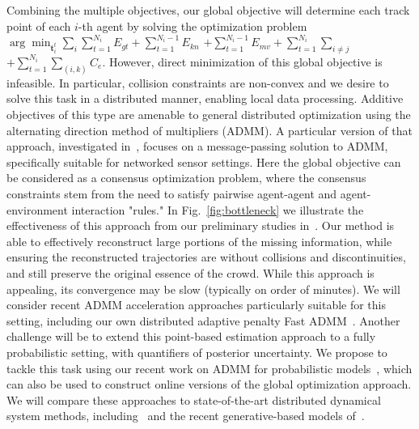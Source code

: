 Combining the multiple objectives, our global objective will determine each track point of each $i$-th agent by solving the optimization problem
$\arg\min_{ \mathbf{t}_{i}^{t} } \sum_i \sum_{t=1}^{N_{i}} E_{gt} + \sum_{t=1}^{N_{i}-1} E_{kn}$ $ + \sum_{t=1}^{N_{i}-1} E_{mv} +\sum_{t=1}^{N_{i}} \sum_{i \neq j}  $ $ +\sum_{t=1}^{N_{i}} \sum_{(i,k)} C_{e}.$
However, direct minimization of this global objective is infeasible. In particular, collision constraints are non-convex and we desire to solve this task in a distributed manner, enabling local data processing. Additive objectives of this type are amenable to general distributed optimization using the alternating direction method of multipliers (ADMM). A particular version of that approach, investigated in~\cite{bento2013,bento2015,yoon2016}, focuses on a message-passing solution to ADMM, specifically suitable for networked sensor settings.  Here the global objective can be considered as a consensus optimization problem, where the consensus constraints stem from the need to satisfy pairwise agent-agent and agent-environment interaction "rules."  In Fig.~\ref{fig:bottleneck} we illustrate the effectiveness of this approach from our preliminary studies in~\cite{yoon2016}.  Our method is able to effectively reconstruct large portions of the missing information, while ensuring the reconstructed trajectories are without collisions and discontinuities, and still preserve the original essence of the crowd.  While this approach is appealing, its convergence may be slow (typically on order of minutes).  We will consider recent ADMM acceleration approaches particularly suitable for this setting, including our own distributed adaptive penalty Fast ADMM~\cite{song2016aaai}.  Another challenge will be to extend this point-based estimation approach to a fully probabilistic setting, with quantifiers of posterior uncertainty.  We propose to tackle this task using our recent work on ADMM for probabilistic models~\cite{yoon2012,behnam2016}, which can also be used to construct online versions of the global optimization approach.  We will compare these approaches to state-of-the-art distributed dynamical system methods, including~\cite{Das2013-mk,kamal2013information} and the recent generative-based models of~\cite{zhou2012}.

